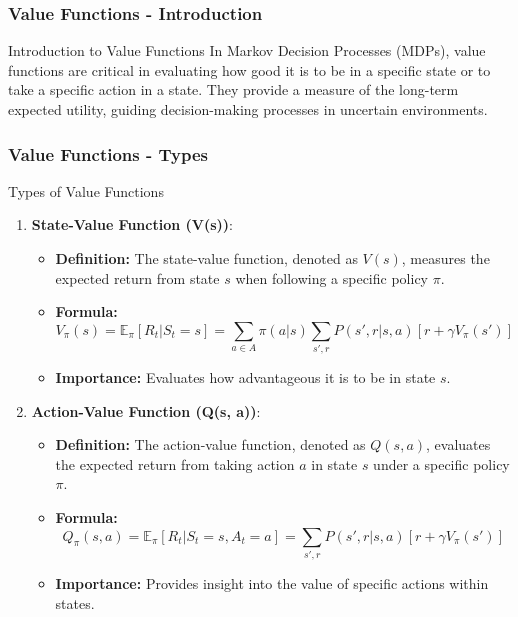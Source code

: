\documentclass{beamer}
\begin{document}
\begin{frame}[fragile]
    \frametitle{Value Functions - Introduction}
    \begin{block}{Introduction to Value Functions}
        In Markov Decision Processes (MDPs), value functions are critical in evaluating how good it is to be in a specific state or to take a specific action in a state. 
        They provide a measure of the long-term expected utility, guiding decision-making processes in uncertain environments.
    \end{block}
\end{frame}

\begin{frame}[fragile]
    \frametitle{Value Functions - Types}
    \begin{block}{Types of Value Functions}
        \begin{enumerate}
            \item \textbf{State-Value Function (V(s))}:
                \begin{itemize}
                    \item \textbf{Definition:} The state-value function, denoted as \( V(s) \), measures the expected return from state \( s \) when following a specific policy \( \pi \).
                    \item \textbf{Formula:} 
                    \[
                    V_{\pi}(s) = \mathbb{E}_{\pi} \left[ R_t | S_t = s \right] = \sum_{a \in A} \pi(a|s) \sum_{s', r} P(s', r | s, a) [r + \gamma V_{\pi}(s')]
                    \]
                    \item \textbf{Importance:} Evaluates how advantageous it is to be in state \( s \).
                \end{itemize}
            
            \item \textbf{Action-Value Function (Q(s, a))}:
                \begin{itemize}
                    \item \textbf{Definition:} The action-value function, denoted as \( Q(s, a) \), evaluates the expected return from taking action \( a \) in state \( s \) under a specific policy \( \pi \).
                    \item \textbf{Formula:} 
                    \[
                    Q_{\pi}(s, a) = \mathbb{E}_{\pi} \left[ R_t | S_t = s, A_t = a \right] = \sum_{s', r} P(s', r | s, a) [r + \gamma V_{\pi}(s')]
                    \]
                    \item \textbf{Importance:} Provides insight into the value of specific actions within states.
                \end{itemize}
        \end{enumerate}
    \end{block}
\end{frame}
\end{document}
